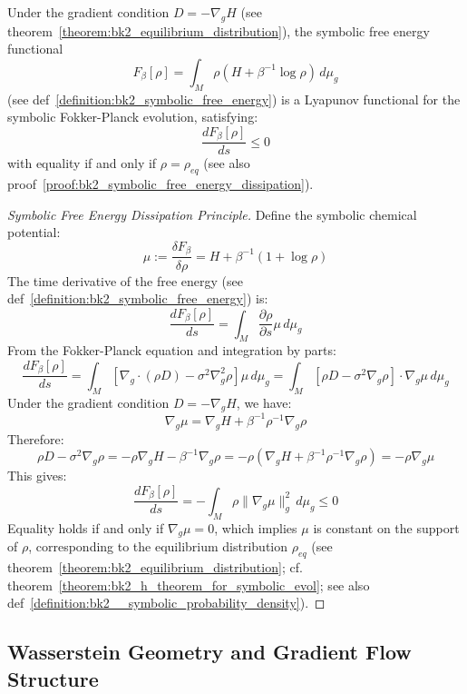 \begin{theorem} 
\label{theorem:bk2_h_theorem_for_symbolic_evol} 
Under the gradient condition $D = -\nabla_g H$ (see theorem~\ref{theorem:bk2_equilibrium_distribution}), the symbolic free energy functional
\[
F_\beta[\rho] = \int_M \rho \left( H + \beta^{-1} \log \rho \right) \, d\mu_g
\]
(see def~\ref{definition:bk2_symbolic_free_energy}) is a Lyapunov functional for the symbolic Fokker-Planck evolution, satisfying:
\[
\frac{dF_\beta[\rho]}{ds} \leq 0
\]
with equality if and only if $\rho = \rho_{eq}$ (see also proof~\ref{proof:bk2_symbolic_free_energy_dissipation}).
\end{theorem}

\begin{proof}[Symbolic Free Energy Dissipation Principle]
\label{proof:bk2_symbolic_free_energy_dissipation}
Define the symbolic chemical potential:
\[
\mu := \frac{\delta F_\beta}{\delta \rho} = H + \beta^{-1}(1 + \log \rho)
\]
The time derivative of the free energy (see def~\ref{definition:bk2_symbolic_free_energy}) is:
\[
\frac{dF_\beta[\rho]}{ds} = \int_M \frac{\partial \rho}{\partial s} \mu \, d\mu_g
\]
From the Fokker-Planck equation and integration by parts:
\[
\frac{dF_\beta[\rho]}{ds} = \int_M [\nabla_g \cdot (\rho D) - \sigma^2 \nabla_g^2 \rho] \mu \, d\mu_g = \int_M [\rho D - \sigma^2 \nabla_g \rho] \cdot \nabla_g \mu \, d\mu_g
\]
Under the gradient condition $D = -\nabla_g H$, we have:
\[
\nabla_g \mu = \nabla_g H + \beta^{-1} \rho^{-1} \nabla_g \rho
\]
Therefore:
\[
\rho D - \sigma^2 \nabla_g \rho = -\rho \nabla_g H - \beta^{-1} \nabla_g \rho = -\rho \left( \nabla_g H + \beta^{-1} \rho^{-1} \nabla_g \rho \right) = -\rho \nabla_g \mu
\]
This gives:
\[
\frac{dF_\beta[\rho]}{ds} = -\int_M \rho \|\nabla_g \mu\|_g^2 \, d\mu_g \leq 0
\]
Equality holds if and only if $\nabla_g \mu = 0$, which implies $\mu$ is constant on the support of $\rho$, corresponding to the equilibrium distribution $\rho_{eq}$ (see theorem~\ref{theorem:bk2_equilibrium_distribution}; cf. theorem~\ref{theorem:bk2_h_theorem_for_symbolic_evol}; see also def~\ref{definition:bk2__symbolic_probability_density}).
\end{proof}

\subsection{Wasserstein Geometry and Gradient Flow Structure}
\label{subsec:bk2_wasserstein_geometry}

